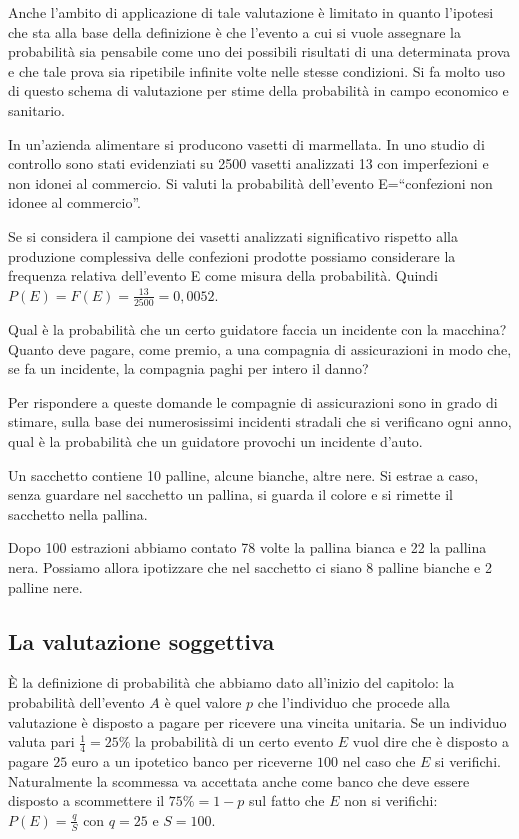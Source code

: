 Anche l'ambito di applicazione di tale valutazione è limitato in quanto 
l'ipotesi che sta alla base della definizione è che l'evento a cui si vuole 
assegnare la probabilità sia pensabile come uno dei possibili risultati di una 
determinata prova e che tale prova sia ripetibile infinite volte nelle stesse 
condizioni.
Si fa molto uso di questo schema di valutazione per stime della probabilità in 
campo economico e sanitario.

\begin{exrig}
\begin{esempio}
In un'azienda alimentare si producono vasetti di marmellata. In uno studio di 
controllo sono stati evidenziati su 2500 vasetti analizzati 13 con imperfezioni 
e non idonei al commercio. Si valuti la probabilità dell'evento E=``confezioni 
non idonee al commercio''.

Se si considera il campione dei vasetti analizzati significativo rispetto alla 
produzione complessiva delle confezioni prodotte possiamo considerare la 
frequenza relativa dell'evento E come misura della probabilità. Quindi 
$P(E)=F(E)=\frac{13}{2500}=0,0052$.
\end{esempio}

\begin{esempio}
Qual è la probabilità che un certo guidatore faccia un incidente con la 
macchina? Quanto deve pagare, come premio, a una compagnia di assicurazioni in 
modo che, se fa un incidente, la compagnia paghi per intero il danno?

Per rispondere a queste domande le compagnie di assicurazioni sono in grado di 
stimare, sulla base dei numerosissimi incidenti stradali che si verificano ogni 
anno, qual è la probabilità che un guidatore provochi un incidente d'auto.
\end{esempio}

\begin{esempio}
Un sacchetto contiene 10 palline, alcune bianche, altre nere. Si estrae a caso, 
senza guardare nel sacchetto un pallina, si guarda il colore e si rimette il 
sacchetto nella pallina.

Dopo 100 estrazioni abbiamo contato 78 volte la pallina bianca e 22 la pallina 
nera. Possiamo allora ipotizzare che nel sacchetto ci siano 8 palline bianche e 
2 palline nere.
\end{esempio}
\end{exrig}
\subsection{La valutazione soggettiva}
È la definizione di probabilità che abbiamo dato all'inizio del capitolo: la 
probabilità dell'evento $A$ è quel valore $p$ che l'individuo che procede alla 
valutazione è disposto a pagare per ricevere una vincita unitaria. Se un 
individuo valuta pari $\frac 1 4=25\%$ la probabilità di un certo evento $E$ 
vuol dire che è disposto a pagare $25$ euro a un ipotetico banco per riceverne 
$100$ nel caso che $E$ si verifichi. Naturalmente la scommessa va accettata 
anche come banco che deve essere disposto a scommettere il $75\%=1-p$ sul fatto 
che $E$ non si verifichi: $P(E)=\frac q S$ con $ q=25 $ e $S=100$.
